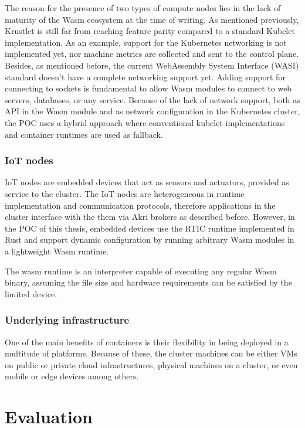 \documentclass{ieeeaccess}
\begin{document}
The reason for the presence of two types of compute nodes lies in the lack of maturity of the Wasm ecosystem at the time of writing. As mentioned previously, Krustlet is still far from reaching feature parity compared to a standard Kubelet implementation. As an example, support for the Kubernetes networking is not implemented yet, nor machine metrics are collected and sent to the control plane. Besides, as mentioned before, the current WebAssembly System Interface (WASI) standard doesn't have a complete networking support yet. Adding support for connecting to sockets is fundamental to allow Wasm modules to connect to web servers, databases, or any service. Because of the lack of network support, both as API in the Wasm module and as network configuration in the Kubernetes cluster, the POC uses a hybrid approach where conventional kubelet implementations and container runtimes are used as fallback.

\subsubsection{IoT nodes}

IoT nodes are embedded devices that act as sensors and actuators, provided as service to the cluster. The IoT nodes are heterogeneous in runtime implementation and communication protocols, therefore applications in the cluster interface with the them via Akri brokers as described before. However, in the POC of this thesis, embedded devices use the RTIC runtime implemented in Rust and support dynamic configuration by running arbitrary Wasm modules in a lightweight Wasm runtime.

The wasm runtime is an interpreter capable of executing any regular Wasm binary, assuming the file size and hardware requirements can be satisfied by the limited device.

\subsubsection{Underlying infrastructure}

One of the main benefits of containers is their flexibility in being deployed in a multitude of platforms. Because of these, the cluster machines can be either VMs on public or private cloud infrastructures, physical machines on a cluster, or even mobile or edge devices among others.

\section{Evaluation}
\label{sec:evaluation}
\end{document}
